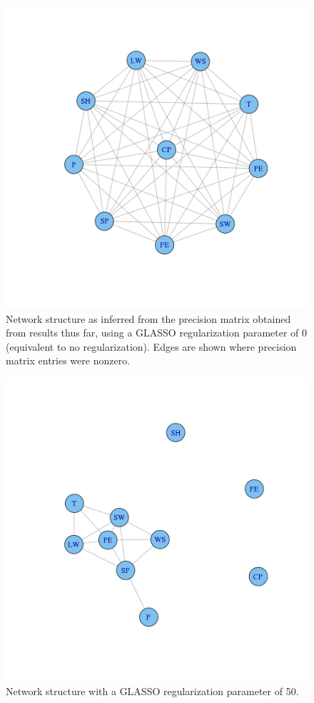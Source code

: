 \documentclass{article}
\begin{document}
\begin{figure}
\includegraphics[bb=0 0 2500 2500,scale=\textwidth]{images/data_0.png}
\caption{Network structure as inferred from the precision matrix obtained from results thus far, using a GLASSO regularization parameter of 0 (equivalent to no regularization). Edges are shown where precision matrix entries were nonzero.}
\label{fig:data_0}
\end{figure}

\begin{figure}
\includegraphics[bb=0 0 2500 2500,scale=\textwidth]{images/data_50.png}
\caption{Network structure with a GLASSO regularization parameter of 50.}
\label{fig:data_50}
\end{figure}
\end{document}
